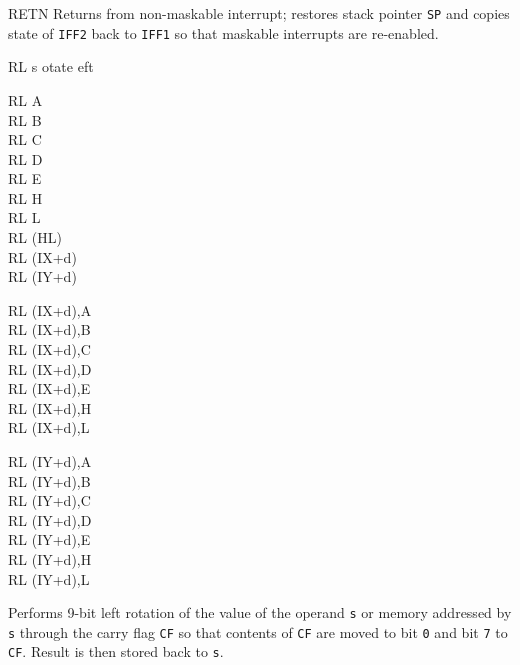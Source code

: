 \begin{basedescript}{
	\desclabelstyle{\multilinelabel}
	\desclabelwidth{3cm}}
\begin{DetailItem}{RETN}
		Returns from non-maskable interrupt; restores stack pointer {\tt SP} and copies state of {\tt IFF2} back to {\tt IFF1} so that maskable interrupts are re-enabled.

		\begin{DetailEffects}
			\FlagsRETN
		\end{DetailEffects}
				
		\begin{DetailTiming}
		\end{DetailTiming}

	\end{DetailItem}

	\begin{DetailItem}{RL s}
		{otate eft}
		{}

		\begin{DetailVariants}
			RL A\\
			RL B\\
			RL C\\
			RL D\\
			RL E\\
			RL H\\
			RL L\\
			RL (HL)\\
			RL (IX+d)\\
			RL (IY+d)

			\columnbreak
			RL (IX+d),A\UNDOC\\
			RL (IX+d),B\UNDOC\\
			RL (IX+d),C\UNDOC\\
			RL (IX+d),D\UNDOC\\
			RL (IX+d),E\UNDOC\\
			RL (IX+d),H\UNDOC\\
			RL (IX+d),L\UNDOC

			\columnbreak
			RL (IY+d),A\UNDOC\\
			RL (IY+d),B\UNDOC\\
			RL (IY+d),C\UNDOC\\
			RL (IY+d),D\UNDOC\\
			RL (IY+d),E\UNDOC\\
			RL (IY+d),H\UNDOC\\
			RL (IY+d),L\UNDOC
		\end{DetailVariants}

		Performs 9-bit left rotation of the value of the operand {\tt s} or memory addressed by {\tt s} through the carry flag {\tt CF} so that contents of {\tt CF} are moved to bit {\tt 0} and bit {\tt 7} to {\tt CF}. Result is then stored back to {\tt s}.


\end{DetailItem}
\end{basedescript}
